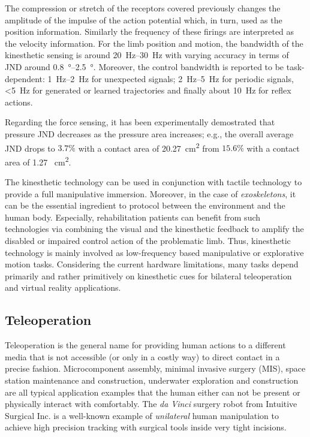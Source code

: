 The compression or stretch of the receptors covered previously changes the amplitude of the impulse of the action potential which, in turn, 
used as the position information. Similarly the frequency of these firings are interpreted as the velocity information. For the limb 
position and motion, the bandwidth of the kinesthetic sensing is around \SIrange{20}{30}{\hertz} with varying accuracy in terms of JND 
around \SIrange{0.8}{2.5}{\degree}. Moreover, the control bandwidth is reported to be task-dependent: \SIrange{1}{2}{\hertz} for 
unexpected signals; \SIrange{2}{5}{\hertz} for periodic signals, \SI[parse-numbers=false]{<5}{\hertz} for generated or learned 
trajectories and finally about \SI{10}{\hertz} for reflex actions. 

Regarding the force sensing, it has been experimentally demostrated that pressure JND decreases as the pressure area increases; e.g., the
overall average JND drops to $3.7\%$ with a contact area of \SI{20.27}{\centi\meter\squared} from $15.6\%$ with a contact area of \SI{1.27
}{\centi\meter\squared}. 

The kinesthetic technology can be used in conjunction with tactile technology to provide a full manipulative immersion. Moreover, in the 
case of \emph{exoskeletons}, it can be the essential ingredient to protocol between the environment and the human body. Especially, 
rehabilitation patients can benefit from such technologies via combining the visual and the kinesthetic feedback to amplify the disabled 
or impaired control action of the problematic limb. Thus, kinesthetic technology is mainly involved as low-frequency based manipulative 
or explorative motion tasks. Considering the current hardware limitations, many tasks depend primarily and rather primitively on kinesthetic 
cues for bilateral teleoperation and virtual reality applications.


\subsection{Teleoperation}
Teleoperation is the general name for providing human actions to a different media that is not accessible (or only in a costly way) to 
direct contact in a precise fashion. Microcomponent assembly, minimal invasive surgery (MIS), space station maintenance and construction, 
underwater exploration and construction are all typical application examples that the human either can not be present or physically 
interact with comfortably. The \emph{da Vinci}\raisebox{0.5ex}{\scriptsize\texttrademark} surgery robot from Intuitive Surgical Inc. is a 
well-known example of \emph{unilateral} human manipulation to achieve high precision tracking with surgical tools inside very tight 
incisions. 

